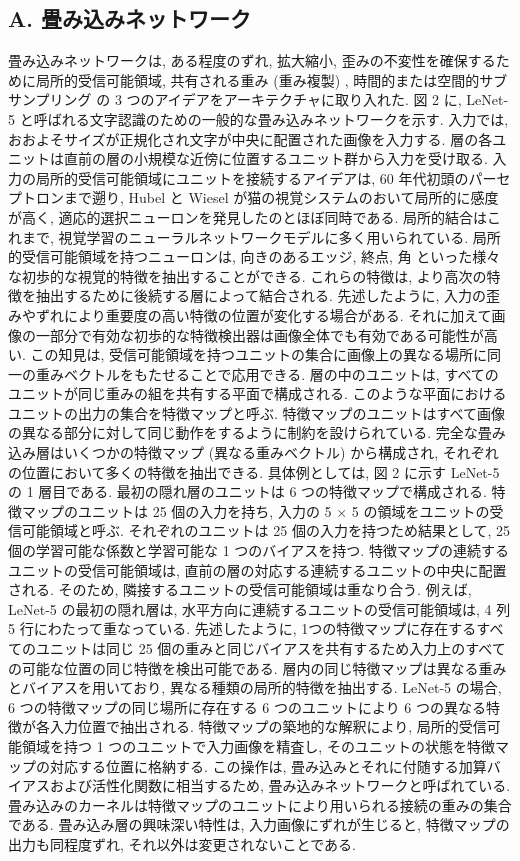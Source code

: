 \documentclass[twocolumn]{jarticle}     %
\begin{document}
\subsection{A. 畳み込みネットワーク}
畳み込みネットワークは, ある程度のずれ, 拡大縮小, 歪みの不変性を確保するために局所的受信可能領域, 共有される重み (重み複製) , 時間的または空間的サブサンプリング の 3 つのアイデアをアーキテクチャに取り入れた.
図 2 に, LeNet-5 と呼ばれる文字認識のための一般的な畳み込みネットワークを示す. 入力では, おおよそサイズが正規化され文字が中央に配置された画像を入力する. 層の各ユニットは直前の層の小規模な近傍に位置するユニット群から入力を受け取る. 入力の局所的受信可能領域にユニットを接続するアイデアは, 60 年代初頭のパーセプトロンまで遡り, Hubel と Wiesel が猫の視覚システムのおいて局所的に感度が高く, 適応的選択ニューロンを発見したのとほぼ同時である. 
局所的結合はこれまで, 視覚学習のニューラルネットワークモデルに多く用いられている. 局所的受信可能領域を持つニューロンは, 向きのあるエッジ, 終点, 角 といった様々な初歩的な視覚的特徴を抽出することができる. これらの特徴は, より高次の特徴を抽出するために後続する層によって結合される. 先述したように, 入力の歪みやずれにより重要度の高い特徴の位置が変化する場合がある. それに加えて画像の一部分で有効な初歩的な特徴検出器は画像全体でも有効である可能性が高い. この知見は, 受信可能領域を持つユニットの集合に画像上の異なる場所に同一の重みベクトルをもたせることで応用できる.
層の中のユニットは, すべてのユニットが同じ重みの組を共有する平面で構成される. このような平面におけるユニットの出力の集合を特徴マップと呼ぶ. 特徴マップのユニットはすべて画像の異なる部分に対して同じ動作をするように制約を設けられている. 完全な畳み込み層はいくつかの特徴マップ (異なる重みベクトル) から構成され, それぞれの位置において多くの特徴を抽出できる. 具体例としては, 図 2 に示す LeNet-5 の 1 層目である. 最初の隠れ層のユニットは 6 つの特徴マップで構成される. 
特徴マップのユニットは 25 個の入力を持ち, 入力の 5 × 5 の領域をユニットの受信可能領域と呼ぶ. それぞれのユニットは 25 個の入力を持つため結果として, 25 個の学習可能な係数と学習可能な 1 つのバイアスを持つ. 特徴マップの連続するユニットの受信可能領域は, 直前の層の対応する連続するユニットの中央に配置される.
そのため, 隣接するユニットの受信可能領域は重なり合う. 例えば, LeNet-5 の最初の隠れ層は, 水平方向に連続するユニットの受信可能領域は, 4 列 5 行にわたって重なっている. 先述したように, 1つの特徴マップに存在するすべてのユニットは同じ 25 個の重みと同じバイアスを共有するため入力上のすべての可能な位置の同じ特徴を検出可能である.
層内の同じ特徴マップは異なる重みとバイアスを用いており, 異なる種類の局所的特徴を抽出する. LeNet-5 の場合, 6 つの特徴マップの同じ場所に存在する 6 つのユニットにより 6 つの異なる特徴が各入力位置で抽出される. 特徴マップの築地的な解釈により, 局所的受信可能領域を持つ 1 つのユニットで入力画像を精査し, そのユニットの状態を特徴マップの対応する位置に格納する. この操作は, 畳み込みとそれに付随する加算バイアスおよび活性化関数に相当するため, 畳み込みネットワークと呼ばれている. 畳み込みのカーネルは特徴マップのユニットにより用いられる接続の重みの集合である. 畳み込み層の興味深い特性は, 入力画像にずれが生じると, 特徴マップの出力も同程度ずれ, それ以外は変更されないことである.
\end{document}
